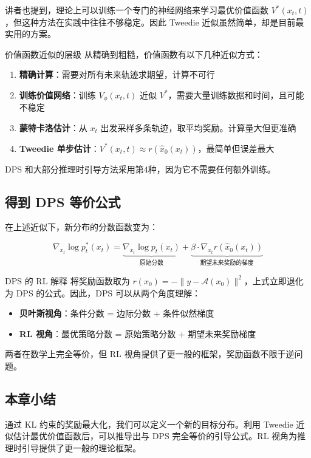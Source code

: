 \documentclass[a4paper]{article}
\begin{document}
讲者也提到，理论上可以训练一个专门的神经网络来学习最优价值函数 $V^*(x_t, t)$，但这种方法在实践中往往不够稳定。因此 Tweedie 近似虽然简单，却是目前最实用的方案。

\begin{warningbox}{价值函数近似的层级}
从精确到粗糙，价值函数有以下几种近似方式：
\begin{enumerate}
    \item \textbf{精确计算}：需要对所有未来轨迹求期望，计算不可行
    \item \textbf{训练价值网络}：训练 $V_\phi(x_t, t)$ 近似 $V^*$，需要大量训练数据和时间，且可能不稳定
    \item \textbf{蒙特卡洛估计}：从 $x_t$ 出发采样多条轨迹，取平均奖励。计算量大但更准确
    \item \textbf{Tweedie 单步估计}：$V^*(x_t, t) \approx r(\hat{x}_0(x_t))$，最简单但误差最大
\end{enumerate}
DPS 和大部分推理时引导方法采用第4种，因为它不需要任何额外训练。
\end{warningbox}

\subsection{得到 DPS 等价公式}

在上述近似下，新分布的分数函数变为：

$$\nabla_{x_t} \log p_t^*(x_t) = \underbrace{\nabla_{x_t} \log p_t(x_t)}_{\text{原始分数}} + \underbrace{\beta \cdot \nabla_{x_t} r(\hat{x}_0(x_t))}_{\text{期望未来奖励的梯度}}$$

\begin{importantbox}{DPS 的 RL 解释}
将奖励函数取为 $r(x_0) = -\| y - \mathcal{A}(x_0) \|^2$，上式立即退化为 DPS 的公式。因此，DPS 可以从两个角度理解：
\begin{itemize}
    \item \textbf{贝叶斯视角}：条件分数 = 边际分数 + 条件似然梯度
    \item \textbf{RL 视角}：最优策略分数 = 原始策略分数 + 期望未来奖励梯度
\end{itemize}
两者在数学上完全等价，但 RL 视角提供了更一般的框架，奖励函数不限于逆问题。
\end{importantbox}

\subsection{本章小结}

通过 KL 约束的奖励最大化，我们可以定义一个新的目标分布。利用 Tweedie 近似估计最优价值函数后，可以推导出与 DPS 完全等价的引导公式。RL 视角为推理时引导提供了更一般的理论框架。
\end{document}
